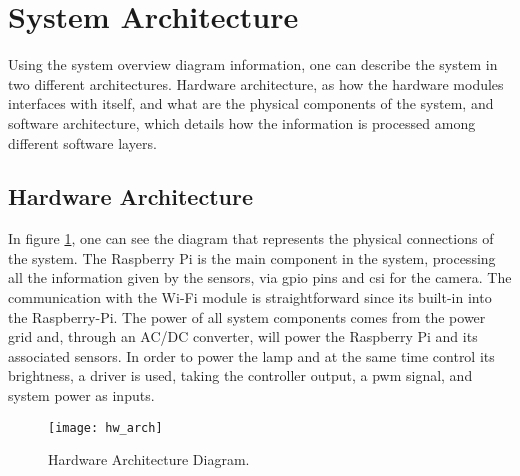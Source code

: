 \section{System Architecture}
Using the system overview diagram information, one can describe the system in two different architectures. Hardware architecture, as how the hardware modules interfaces with itself, and what are the physical components of the system, and software architecture, which details how the information is processed among different software layers.
\subsection{Hardware Architecture}
In figure \ref{fig:hw_arch}, one can see the diagram that represents the physical connections of the system. The Raspberry Pi is the main component in the system, processing all the information given by the sensors, via \ac{gpio} pins and \ac{csi} for the camera. The communication with the Wi-Fi module is straightforward since its built-in into the Raspberry-Pi.
The power of all system components comes from the power grid and, through an AC/DC converter, will power the Raspberry Pi and its associated sensors.
In order to power the lamp and at the same time control its brightness, a driver is used, taking the controller output, a \ac{pwm} signal, and system power as inputs. 
\begin{figure}[ht]
        \centering
        \texttt{[image: hw\_arch]}
        \caption{Hardware Architecture Diagram.}
        \label{fig:hw_arch}
\end{figure}
